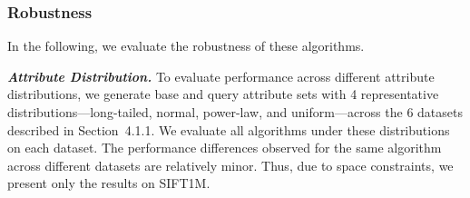 \documentclass[sigconf, nonacm]{acmart}
\begin{document}
{	
	
	
	
	
	
	
	
	\subsubsection{Robustness}In the following, we evaluate the robustness of these algorithms.
	
	\textit{\textbf{Attribute Distribution.}} To evaluate performance across different attribute distributions, we generate base and query attribute sets with 4 representative distributions—long-tailed, normal, power-law, and uniform—across the 6 datasets described in Section~4.1.1. We evaluate all algorithms under these distributions on each dataset. The performance differences observed for the same algorithm across different datasets are relatively minor. Thus, due to space constraints, we present only the results on SIFT1M.

}
\end{document}
